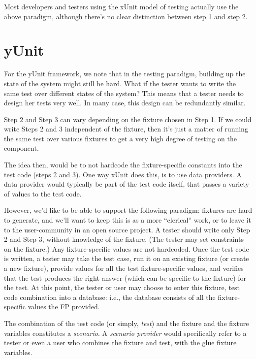 \documentclass{article}
\begin{document}
Most developers and testers using the xUnit model of testing actually
use the above paradigm, although there's no clear distinction between
step 1 and step 2.

\section{yUnit}

For the yUnit framework, we note that in the testing paradigm,
building up the state of the system might still be hard. What if the
tester wants to write the same test over different states of the
system? This means that a tester needs to design her tests very
well. In many case, this design can be redundantly similar.

Step 2 and Step 3 can vary depending on the fixture chosen in Step
1. If we could write Steps 2 and 3 independent of the fixture, then
it's just a matter of running the same test over various fixtures to
get a very high degree of testing on the component.

The idea then, would be to not hardcode the fixture-specific constants
into the test code (steps 2 and 3). One way xUnit does this, is to use
data providers. A data provider would typically be part of the test
code itself, that passes a variety of values to the test code.

However, we'd like to be able to support the following paradigm:
fixtures are hard to generate, and we'll want to keep this is as a
more ``clerical'' work, or to leave it to the user-community in an
open source project. A tester should write only Step 2 and Step 3,
without knowledge of the fixture. (The tester may set constraints on
the fixture.) Any fixture-specific values are not hardcoded. Once the
test code is written, a tester may take the test case,
run it on an existing fixture (or create a new fixture), provide
values for all the test fixture-specific values, and verifies that the
test produces the right answer (which can be specific to the fixture)
for the test. At this point, the tester or user may choose to enter
this fixture, test code combination into a database: i.e., the
database consists of all the fixture-specific values the FP provided. 

The combination of the test code (or simply, \emph{test}) and the
fixture and the fixture variables constitutes a \emph{scenario}. A
\emph{scenario provider} would specifically refer to a tester or even
a user who combines the fixture and test, with the glue fixture variables.
\end{document}
